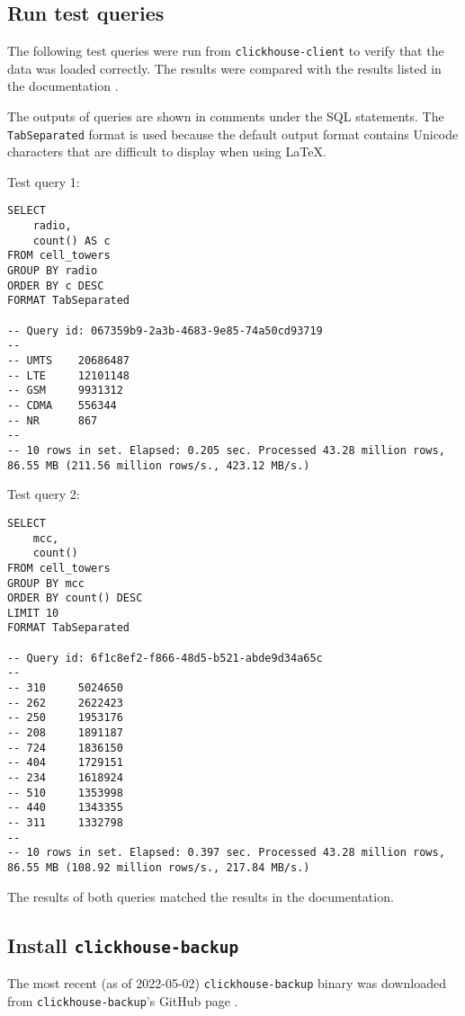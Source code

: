 \subsection{Run test queries}
\label{sec:org19e6a30}
The following test queries were run from \texttt{clickhouse-client} to verify that
the data was loaded correctly.
The results were compared with the results listed in the documentation \cite{noauthor_cell_nodate}.

The outputs of queries are shown in comments under the SQL statements.
The \texttt{TabSeparated} format is used because the default output format
contains Unicode characters that are difficult to display when using \LaTeX.

Test query 1:
\begin{verbatim}
SELECT
    radio,
    count() AS c
FROM cell_towers
GROUP BY radio
ORDER BY c DESC
FORMAT TabSeparated

-- Query id: 067359b9-2a3b-4683-9e85-74a50cd93719
--
-- UMTS    20686487
-- LTE     12101148
-- GSM     9931312
-- CDMA    556344
-- NR      867
--
-- 10 rows in set. Elapsed: 0.205 sec. Processed 43.28 million rows, 86.55 MB (211.56 million rows/s., 423.12 MB/s.)
\end{verbatim}

Test query 2:
\begin{verbatim}
SELECT
    mcc,
    count()
FROM cell_towers
GROUP BY mcc
ORDER BY count() DESC
LIMIT 10
FORMAT TabSeparated

-- Query id: 6f1c8ef2-f866-48d5-b521-abde9d34a65c
--
-- 310     5024650
-- 262     2622423
-- 250     1953176
-- 208     1891187
-- 724     1836150
-- 404     1729151
-- 234     1618924
-- 510     1353998
-- 440     1343355
-- 311     1332798
--
-- 10 rows in set. Elapsed: 0.397 sec. Processed 43.28 million rows, 86.55 MB (108.92 million rows/s., 217.84 MB/s.)
\end{verbatim}

The results of both queries matched the results in the documentation.

\subsection{Install \texttt{clickhouse-backup}}
\label{sec:org7ea2ed5}
The most recent (as of 2022-05-02) \texttt{clickhouse-backup} binary was downloaded
from \texttt{clickhouse-backup}'s GitHub page \cite{akulov_clickhouse-backup_2022}.

